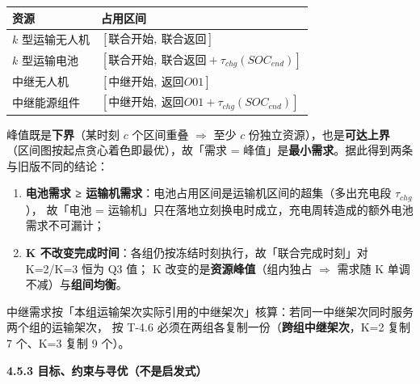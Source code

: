 \documentclass[
  10.5pt,
]{extarticle}
\newcounter{none} %
\providecommand{\tightlist}{%
  \setlength{\itemsep}{0pt}\setlength{\parskip}{0pt}}
\begin{document}
{\def\LTcaptype{none} %
\begin{longtable}[]{@{}
  >{\raggedright\arraybackslash}p{}
  >{\raggedright\arraybackslash}p{}@{}}
\toprule\noalign{}
\begin{minipage}[b]{\linewidth}\raggedright
资源
\end{minipage} & \begin{minipage}[b]{\linewidth}\raggedright
占用区间
\end{minipage} \\
\midrule\noalign{}
\endhead
\bottomrule\noalign{}
\endlastfoot
\(k\) 型运输无人机 & \([\text{联合开始},\ \text{联合返回}]\) \\
\(k\) 型运输电池 &
\([\text{联合开始},\ \text{联合返回}+\tau_{chg}(SOC_{end})]\) \\
中继无人机 & \([\text{中继开始},\ \text{返回}O01]\) \\
中继能源组件 &
\([\text{中继开始},\ \text{返回}O01+\tau_{chg}(SOC_{end})]\) \\
\end{longtable}
}

峰值既是\textbf{下界}（某时刻 \(c\) 个区间重叠 \(\Rightarrow\) 至少
\(c\) 份独立资源），也是\textbf{可达上界}
（区间图按起点贪心着色即最优），故「需求 =
峰值」是\textbf{最小需求}。据此得到两条与旧版不同的结论：

\begin{enumerate}
\def\labelenumi{\arabic{enumi}.}
\tightlist
\item
  \textbf{电池需求 ≥
  运输机需求}：电池占用区间是运输机区间的超集（多出充电段
  \(\tau_{chg}\)）， 故「电池 =
  运输机」只在落地立刻换电时成立，充电周转造成的额外电池需求不可漏计；
\item
  \textbf{K 不改变完成时间}：各组仍按冻结时刻执行，故「联合完成时刻」对
  K=2/K=3 恒为 Q3 值； K 改变的是\textbf{资源峰值}（组内独占
  \(\Rightarrow\) 需求随 K 单调不减）与\textbf{组间均衡}。
\end{enumerate}

中继需求按「本组运输架次实际引用的中继架次」核算：若同一中继架次同时服务两个组的运输架次，
按 T-4.6 必须在两组各复制一份（\textbf{跨组中继架次}，K=2 复制 7 个、K=3
复制 9 个）。

\textbf{4.5.3 目标、约束与寻优（不是启发式）}
\end{document}

